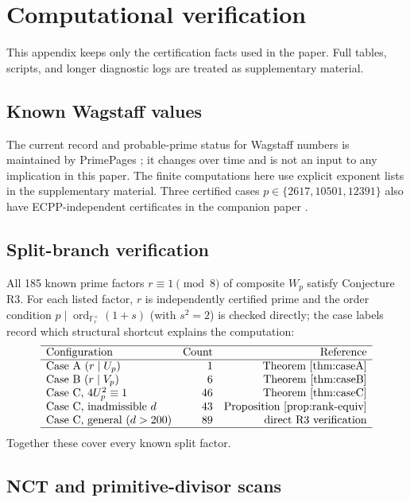 \documentclass[11pt]{amsart}
\theoremstyle{plain}
\theoremstyle{definition}
\theoremstyle{remark}
\numberwithin{equation}{section}
\newcommand{\ord}{\operatorname{ord}}
\newcommand{\F}{\mathbb{F}}
\begin{document}
\section{Computational verification}\label{sec:computational}

This appendix keeps only the certification facts used in the paper. Full tables, scripts, and longer diagnostic logs are treated as supplementary material.

\subsection{Known Wagstaff values}

The current record and probable-prime status for Wagstaff numbers is maintained by PrimePages \cite{ref:PrimePagesWagstaff}; it changes over time and is not an input to any implication in this paper. The finite computations here use explicit exponent lists in the supplementary material. Three certified cases $p\in\{2617,10501,12391\}$ also have ECPP-independent certificates in the companion paper \cite{ref:A}.

\subsection{Split-branch verification}\label{sec:R3-verify}

All 185 known prime factors $r\equiv1\pmod8$ of composite $W_p$ satisfy Conjecture R3. For each listed factor, $r$ is independently certified prime and the order condition $p\mid\ord_{\F_r^\times}(1+s)$ (with $s^2=2$) is checked directly; the case labels record which structural shortcut explains the computation:
\[
\begin{array}{lrr}
\hline
\text{Configuration} & \text{Count} & \text{Reference}\\
\hline
\text{Case A }(r\mid U_p) & 1 & \text{Theorem~\ref{thm:caseA}}\\
\text{Case B }(r\mid V_p) & 6 & \text{Theorem~\ref{thm:caseB}}\\
\text{Case C, }4U_p^2\equiv1 & 46 & \text{Theorem~\ref{thm:caseC}}\\
\text{Case C, inadmissible }d & 43 & \text{Proposition~\ref{prop:rank-equiv}}\\
\text{Case C, general }(d>200) & 89 & \text{direct R3 verification}\\
\hline
\end{array}
\]
Together these cover every known split factor.

\subsection{NCT and primitive-divisor scans}\label{sec:primdiv-survey}\label{sec:nct-verify}
\end{document}

